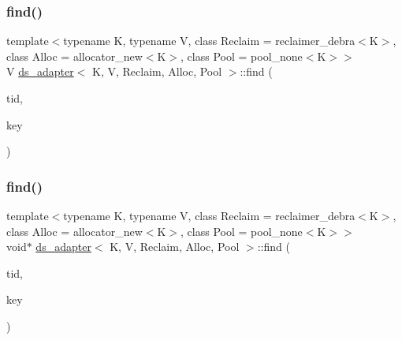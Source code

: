 \subsubsection{\texorpdfstring{find()}{find()}\hspace{0.1cm}{\footnotesize\ttfamily [15/26]}}
{\footnotesize\ttfamily template$<$typename K, typename V, class Reclaim = reclaimer\+\_\+debra$<$\+K$>$, class Alloc = allocator\+\_\+new$<$\+K$>$, class Pool = pool\+\_\+none$<$\+K$>$$>$ \\
V \hyperlink{classds__adapter}{ds\+\_\+adapter}$<$ K, V, Reclaim, Alloc, Pool $>$\+::find (\begin{DoxyParamCaption}\item[{const int}]{tid,  }\item[{const K \&}]{key }\end{DoxyParamCaption})\hspace{0.3cm}{\ttfamily [inline]}}

\mbox{\label{classds__adapter_a72789b1ba53b99df79b49b42e4d205ac}} 
\subsubsection{\texorpdfstring{find()}{find()}\hspace{0.1cm}{\footnotesize\ttfamily [16/26]}}
{\footnotesize\ttfamily template$<$typename K, typename V, class Reclaim = reclaimer\+\_\+debra$<$\+K$>$, class Alloc = allocator\+\_\+new$<$\+K$>$, class Pool = pool\+\_\+none$<$\+K$>$$>$ \\
void$\ast$ \hyperlink{classds__adapter}{ds\+\_\+adapter}$<$ K, V, Reclaim, Alloc, Pool $>$\+::find (\begin{DoxyParamCaption}\item[{const int}]{tid,  }\item[{const K \&}]{key }\end{DoxyParamCaption})\hspace{0.3cm}{\ttfamily [inline]}}

\mbox{\label{classds__adapter_a0109b0d011810f687c9e9273eb1d1bc8}} 
